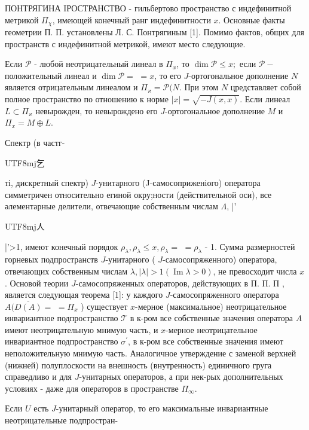 \documentclass[10pt]{article}
\begin{document}
ПОНТРЯГИНА IРОСТРАНСТВО - гильбертово пространство с индефинитной метрикой $\Pi_{\chi}$, имеющей конечный ранг индефинитности $x$. Основные факты геометрии П. П. установлены Л. С. Понтрягиным [1]. Помимо фактов, общих для пространств с индефинитной метрикой, имеют место следующие.



Если $\mathscr{P}$ - любой неотрицательный линеал в $\Pi_{x}$, то $\operatorname{dim} \mathscr{P} \leqslant x ;$ если $\mathscr{P}-$ положительный линеал и $\operatorname{dim} \mathscr{P}=$ $=x$, то его $J$-ортогональное дополнение $N$ является отрицательным линеалом и $\Pi_{\varkappa}=\mathscr{P}(N$. При этом $N$ цредставляет собой полное пространство по отношению к норме $|x|=\sqrt{-J(x, x)}$. Если линеал $L \subset \Pi_{\varkappa}$ невырожден, то невырождено его $J$-ортогональное дополнение $M$ и $\Pi_{x}=M \oplus L$.



Спектр (в частг-\begin{CJK}{UTF8}{mj}乞\end{CJK}ті, дискретный спектр) $J$-унитарного (J-самосоприженіого) оператора симметричен относительно егиной окру;ности (действительной оси), все әлементарные делители, отвечающие собственным числам $\mathcal{\Lambda}$, |'\begin{CJK}{UTF8}{mj}人\end{CJK}|'>1, имеют конечный порядок $\rho_{\lambda}, \rho_{\lambda} \leqslant x, \rho_{\lambda}=$ $=\rho_{\lambda}$ - 1. Сумма размерностей горневых подпространств $J$-унитарного ( $J$-самосопряженного) оператора, отвечающих собственным числам $\lambda,|\lambda|>1(\operatorname{Im} \lambda>0)$, не превосходит числа $x$. Основой теории $J$-самосопряженных операторов, действующих в П. П. П , является следующая теорема [1]: у каждого $J$-самосопряженного оператора $A(\overline{D(A)}=$ $=\Pi_{x}$ ) существует $x$-мерное (максимальное) неотрицательное инвариантное подпространство $\mathscr{T}$ в к-ром все собственные значения оператора $A$ имеют неотрицательную мнимую часть, и $x$-мерное неотрицательное инвариантное подпространство $\mathscr{\sigma}^{\prime}$, в к-ром все собственные значения имеют неположительную мнимую часть. Аналогичное утверждение с заменой верхней (нижней) полуплоскости на внешность (внутренность) единичного груга справедливо и для $J$-унитарных операторов, а при нек-рых дополнительных условиях - даже для операторов в пространстве $\Pi_{\infty}$.



Если $U$ есть $J$-унитарный оператор, то его максимальные инвариантные неотрицательные подпростран-
\end{document}
